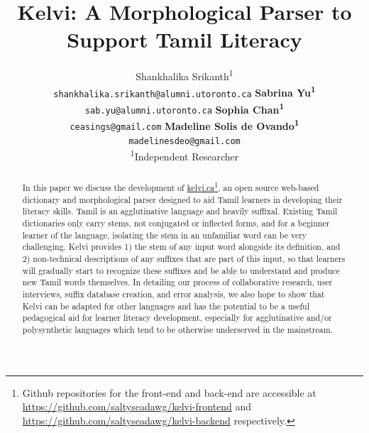 \documentclass[11pt]{article}
\title{Kelvi: A Morphological Parser to Support Tamil Literacy}
\author{Shankhalika Srikanth\textsuperscript{1} \\ \texttt{shankhalika.srikanth@alumni.utoronto.ca} 
   \And \textbf{Sabrina Yu\textsuperscript{1}} \\ \texttt{sab.yu@alumni.utoronto.ca}
   \AND 
   \textbf{Sophia Chan\textsuperscript{1}} \\ \texttt{ceasings@gmail.com}
   \And \textbf{Madeline Solis de Ovando\textsuperscript{1}} \\ \texttt{madelinesdeo@gmail.com}
   \AND
   \\
   \textsuperscript{1}Independent Researcher
   \\
}
\begin{document}
\maketitle
\begin{abstract}
In this paper we discuss the development of \href{kelvi.ca}{kelvi.ca}\footnote{Github repositories for the front-end and back-end are accessible at \href{https://github.com/saltyseadawg/kelvi-frontend}{https://github.com/saltyseadawg/kelvi-frontend} and \href{https://github.com/saltyseadawg/kelvi-backend}{https://github.com/saltyseadawg/kelvi-backend} respectively.}, an open source web-based dictionary and morphological parser designed to aid Tamil learners in developing their literacy skills. 
Tamil is an agglutinative language and heavily suffixal. Existing Tamil dictionaries only carry stems, not conjugated or inflected forms, and for a beginner learner of the language, isolating the stem in an unfamiliar word can be very challenging. 
Kelvi provides 1) the stem of any input word alongside its definition, and 2) non-technical descriptions of any suffixes that are part of this input, so that learners will gradually start to recognize these suffixes and be able to understand and produce new Tamil words themselves. 
In detailing our process of collaborative research, user interviews, suffix database creation, and error analysis, we also hope to show that Kelvi can be adapted for other languages and has the potential to be a useful pedagogical aid for learner literacy development, especially for agglutinative and/or polysynthetic languages which tend to be otherwise underserved in the mainstream.
\end{abstract}
\end{document}
